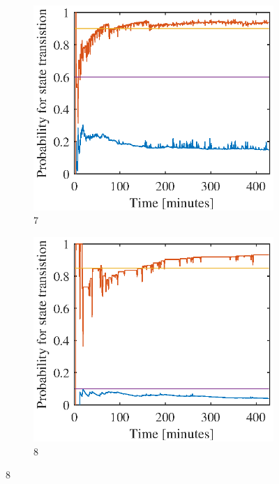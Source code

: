 \begin{figure}[htbp]
	\begin{subfigure}[t]{0.5\linewidth}
		\centering
		\includegraphics[width=1\linewidth]{chapters/appendix/figures/learning_curves/obs7}
		\caption{7}
	\end{subfigure}
	\hspace*{\fill}
	\begin{subfigure}[t]{0.5\linewidth}
		\centering
		\includegraphics[width=1\linewidth]{chapters/appendix/figures/learning_curves/obs8}
		\caption{8}
	\end{subfigure}



\end{figure}
